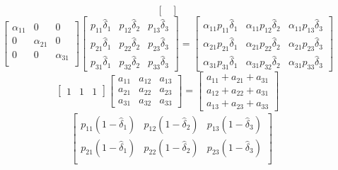 \documentclass[journal,twoside,web]{ieeecolor}
\begin{document}
\begin{figure*}[ht]
\begin{equation*}
\begin{bmatrix}
\end{bmatrix}
\end{equation*}
\begin{equation*}
    \begin{bmatrix}
    \alpha_{11} & 0 & 0 \\
    0 & \alpha_{21} & 0 \\
    0 & 0 & \alpha_{31} \\
\end{bmatrix}
\begin{bmatrix}
    p_{11}\hat{\delta}_{1}  & p_{12}\hat{\delta}_{2}  & p_{13}\hat{\delta}_{3}  \\
    p_{21}\hat{\delta}_{1}  & p_{22}\hat{\delta}_{2}  & p_{23}\hat{\delta}_{3}  \\
    p_{31}\hat{\delta}_{1}  & p_{32}\hat{\delta}_{2}  & p_{33}\hat{\delta}_{3}  
\end{bmatrix}=
\begin{bmatrix}
    \alpha_{11}p_{11}\hat{\delta}_{1}  & \alpha_{11}p_{12}\hat{\delta}_{2}  & \alpha_{11}p_{13}\hat{\delta}_{3}  \\
    \alpha_{21}p_{21}\hat{\delta}_{1}  & \alpha_{21}p_{22}\hat{\delta}_{2}  & \alpha_{21}p_{23}\hat{\delta}_{3}  \\
    \alpha_{31}p_{31}\hat{\delta}_{1}  & \alpha_{31}p_{32}\hat{\delta}_{2}  & \alpha_{31}p_{33}\hat{\delta}_{3}  
\end{bmatrix}
\end{equation*}
\begin{equation*}
\begin{bmatrix}
    1 & 1 & 1
\end{bmatrix} 
\begin{bmatrix}
    a_{11}  & a_{12}  & a_{13}  \\
    a_{21}  & a_{22}  & a_{23}  \\
    a_{31}  & a_{32}  & a_{33}  
\end{bmatrix} = 
\begin{bmatrix}
    a_{11}  + a_{21}  + a_{31}  \\
    a_{12}  + a_{22}  + a_{31}  \\
    a_{13}  + a_{23}  + a_{33}  
\end{bmatrix}
\end{equation*}
\begin{align*}
&\begin{bmatrix}
    p_{11}(1-\hat{\delta}_{1}) & p_{12}(1-\hat{\delta}_{2}) & p_{13}(1-\hat{\delta}_{3}) \\
    p_{21}(1-\hat{\delta}_{1}) & p_{22}(1-\hat{\delta}_{2}) & p_{23}(1-\hat{\delta}_{3}) \\

\end{bmatrix}
\end{align*}
\end{figure*}
\end{document}
